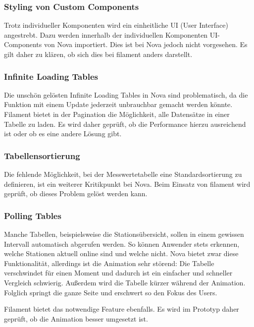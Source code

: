 \subsubsection{Styling von Custom Components}
Trotz individueller Komponenten wird ein einheitliche UI (User Interface) angestrebt.
Dazu werden innerhalb der individuellen Komponenten UI-Components von Nova importiert.
Dies ist bei Nova jedoch nicht vorgesehen.
Es gilt daher zu klären, ob sich dies bei filament anders darstellt.

\subsubsection{Infinite Loading Tables}
Die unschön gelösten Infinite Loading Tables in Nova sind problematisch, da die Funktion mit einem Update jederzeit unbrauchbar gemacht werden könnte.
Filament bietet in der Pagination die Möglichkeit, alle Datensätze in einer Tabelle zu laden.
Es wird daher geprüft, ob die Performance hierzu ausreichend ist oder ob es eine andere Lösung gibt.

\subsubsection{Tabellensortierung}
Die fehlende Möglichkeit, bei der Messwertetabelle eine Standardsortierung zu definieren, ist ein weiterer Kritikpunkt bei Nova.
Beim Einsatz von filament wird geprüft, ob dieses Problem gelöst werden kann.

\subsubsection{Polling Tables}
Manche Tabellen, beispielsweise die Stationsübersicht, sollen in einem gewissen Intervall automatisch abgerufen werden.
So können Anwender stets erkennen, welche Stationen aktuell online sind und welche nicht.
Nova bietet zwar diese Funktionalität, allerdings ist die Animation sehr störend:
Die Tabelle verschwindet für einen Moment und dadurch ist ein einfacher und schneller Vergleich schwierig.
Außerdem wird die Tabelle kürzer während der Animation.
Folglich springt die ganze Seite und erschwert so den Fokus des Users.

Filament bietet das notwendige Feature ebenfalls.
Es wird im Prototyp daher geprüft, ob die Animation besser umgesetzt ist.
